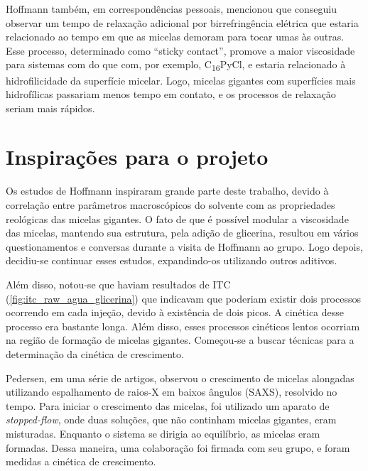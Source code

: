 		
		Hoffmann também, em correspondências pessoais, mencionou que conseguiu observar um tempo de relaxação adicional por birrefringência elétrica\cite{Hoffmann1990} que estaria relacionado ao tempo em que as micelas demoram para tocar umas às outras. Esse processo, determinado como ``sticky contact''\cite{Hoffmann2010, Hoffmann2012a, Yamashita2006}, promove a maior viscosidade para sistemas com \CTAB{} do que com, por exemplo, C\textsubscript{16}PyCl, e estaria relacionado à hidrofilicidade da superfície micelar. Logo, micelas gigantes com superfícies mais hidrofílicas passariam menos tempo em contato, e os processos de relaxação seriam mais rápidos. 
		


		\chapter{Inspirações para o projeto} 

		Os estudos de Hoffmann inspiraram grande parte deste trabalho, devido à correlação entre parâmetros macroscópicos do solvente com as propriedades reológicas das micelas gigantes. O fato de que é possível modular a viscosidade das micelas, mantendo sua estrutura, pela adição de glicerina, resultou em vários questionamentos e conversas durante a visita de Hoffmann ao grupo. Logo depois, decidiu-se continuar esses estudos, expandindo-os utilizando outros aditivos.
		
		Além disso, notou-se que haviam resultados de ITC (\autoref{fig:itc_raw_agua_glicerina}) que indicavam que poderiam existir dois processos ocorrendo em cada injeção, devido à existência de dois picos. A cinética desse processo era bastante longa. Além disso, esses processos cinéticos lentos ocorriam na região de formação de micelas gigantes. Começou-se a buscar técnicas para a determinação da cinética de crescimento.
		
		Pedersen, em uma série de artigos\cite{Jensen2013a, Jensen2014a, Jensen2016a}, observou o crescimento de micelas alongadas utilizando espalhamento de raios-X em baixos ângulos (SAXS), resolvido no tempo. Para iniciar o crescimento das micelas, foi utilizado um aparato de \emph{stopped-flow}, onde duas soluções, que não continham micelas gigantes, eram misturadas. Enquanto o sistema se dirigia ao equilíbrio, as micelas eram formadas. Dessa maneira, uma colaboração foi firmada com seu grupo, e foram medidas a cinética de crescimento.  
		
